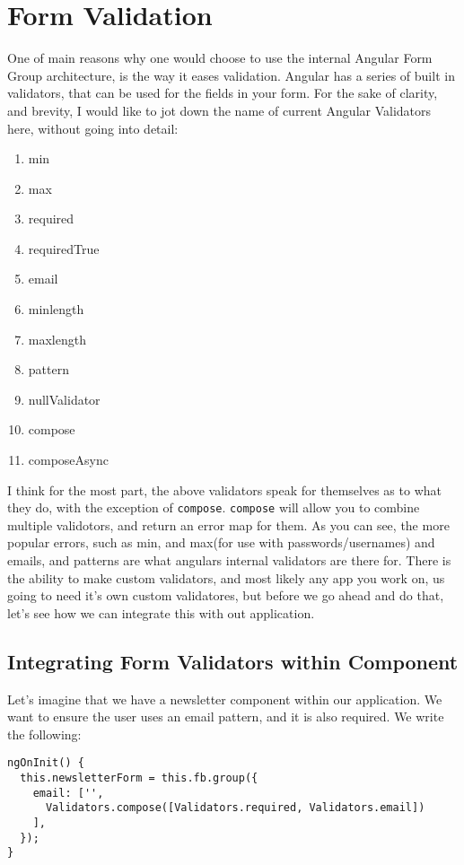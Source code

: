 \chapter{ Form Validation }

One of main reasons why one would choose to use the internal Angular Form 
Group architecture, is the way it eases validation. Angular has a series 
of built in validators, that can be used for the fields in your form. For 
the sake of clarity, and brevity, I would like to jot down the name of current 
Angular Validators here, without going into detail: 
\begin{enumerate}
  \item min
  \item max
  \item required
  \item requiredTrue
  \item email
  \item minlength
  \item maxlength
  \item pattern
  \item nullValidator
  \item compose
  \item composeAsync
\end{enumerate}

I think for the most part, the above validators speak for themselves as to 
what they do, with the exception of \lstinline{compose}. \lstinline{compose}
will allow you to combine multiple validotors, and return an error map for 
them. As you can see, the more popular errors, such as min, and max(for use
with passwords/usernames) and emails, and patterns are what angulars internal 
validators are there for. There is the ability to make custom validators, and 
most likely any app you work on, us going to need it's own custom validatores,
but before we go ahead and do that, let's see how we can integrate this with
out application. 

\section{Integrating Form Validators within Component}
Let's imagine that we have a newsletter component within our application. We 
want to ensure the user uses an email pattern, and it is also required. We write 
the following: 
\begin{lstlisting}
ngOnInit() {
  this.newsletterForm = this.fb.group({
    email: ['',
      Validators.compose([Validators.required, Validators.email])
    ],
  });
}
\end{lstlisting}

